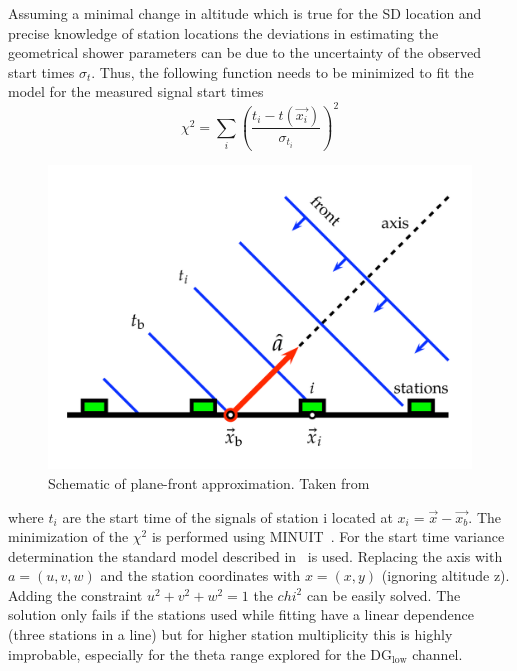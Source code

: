 Assuming a minimal change in altitude which is true for the SD location and precise knowledge of station locations the deviations in estimating the geometrical shower parameters can be due to the uncertainty of the observed start times $\sigma_t$. Thus, the following function needs to be minimized to fit the model for the measured signal start times 
\begin{equation}
  \chi^2 = \sum_{i} \left(\frac{t_i - t(\vec{x_i})}{\sigma_{t_{i}}}\right)^2
\end{equation}

\begin{figure}[t!]
  \centering
  \includegraphics[width=\textwidth]{thesis_figures/Nu_analysis/Plane_fit.pdf}
  \caption{Schematic of plane-front approximation. Taken from~\cite{PierreAuger:2020yab}}
  \label{fig:Plane_fit}
  \end{figure}

where $t_i$ are the start time of the signals of station i located at $x_i = \vec{x} - \vec{x_b}$. The minimization of the $\chi^2$ is performed using MINUIT~\cite{James:1975dr}. For the start time variance determination the standard model described in~\cite{PierreAuger:2020yab} is used. Replacing the axis with $a =(u,v,w)$ and the station coordinates with $x = (x,y)$ (ignoring altitude z). Adding the constraint $u^2 + v^2 + w^2 = 1$ the $chi^2$ can be easily solved. The solution only fails if the stations used while fitting have a linear dependence (three stations in a line) but for higher station multiplicity this is highly improbable, especially for the theta range explored for the DG$\mathrm{_{low}}$ channel.

